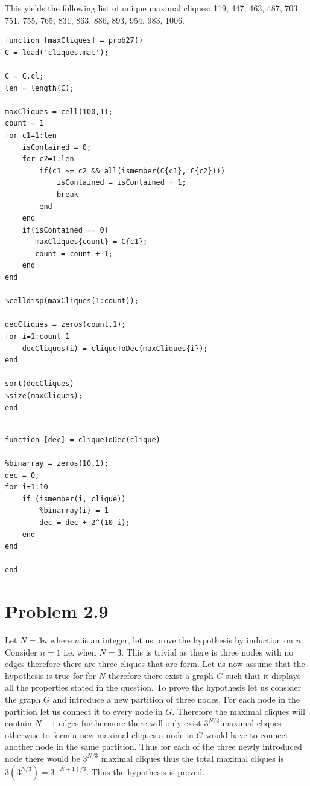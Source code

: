 \documentclass[11pt,a4paper,oneside]{report}
\begin{document}
This yields the following list of unique maximal cliques: 119, 447, 463, 487,
703, 751, 755, 765, 831, 863, 886, 893, 954, 983, 1006.

\begin{lstlisting}
function [maxCliques] = prob27()
C = load('cliques.mat');

C = C.cl;
len = length(C);

maxCliques = cell(100,1);
count = 1
for c1=1:len
    isContained = 0;
    for c2=1:len
        if(c1 ~= c2 && all(ismember(C{c1}, C{c2})))
            isContained = isContained + 1;
            break
        end
    end
    if(isContained == 0)
       maxCliques{count} = C{c1};
       count = count + 1;
    end
end

%celldisp(maxCliques(1:count));

decCliques = zeros(count,1);
for i=1:count-1
    decCliques(i) = cliqueToDec(maxCliques{i});
end
    
sort(decCliques)
%size(maxCliques);
end
\end{lstlisting}

\begin{lstlisting}

function [dec] = cliqueToDec(clique)

%binarray = zeros(10,1);
dec = 0;
for i=1:10
    if (ismember(i, clique))
        %binarray(i) = 1
        dec = dec + 2^(10-i);
    end
end

end

\end{lstlisting}


\section*{Problem 2.9}
Let $N=3n$ where $n$ is an integer, let us prove the hypothesis by induction on $n$. Consider $n=1$ i.e. when $N=3$. This is trivial as there is three nodes with no edges therefore there are three cliques that are form. Let us now assume that the hypothesis is true for for $N$ therefore there exist a graph $G$ such that it displays all the properties stated in the question. To prove the hypothesis let us consider the graph $G$ and introduce a new partition of three nodes. For each node in the partition let us connect it to every node in $G$. Therefore the maximal cliques will contain $N-1$ edges furthermore there will only exist $3^{N/3}$ maximal cliques otherwise to form a new maximal cliques a node in $G$ would have to connect another node in the same partition. Thus for each of the three newly introduced node there would be $3^{N/3}$ maximal cliques thus the total maximal cliques is $3(3^{N/3}) = 3^{(N+1)/3}$. Thus the hypothesis is proved.
\end{document}
